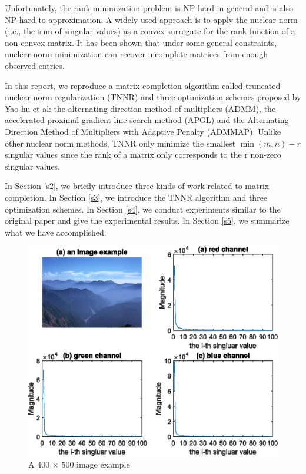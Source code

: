 \documentclass{article}
\begin{document}
{Unfortunately, the rank minimization problem is NP-hard in general and is also NP-hard to approximation.  A widely used approach is to apply the nuclear norm (i.e., the sum of singular values) as a convex surrogate for the rank function of a non-convex matrix. It has been shown that under some general constraints, nuclear norm minimization can recover incomplete matrices from enough observed entries.

In this report, we reproduce a matrix completion algorithm called truncated nuclear norm regularization (TNNR) and three optimization schemes proposed by Yao hu et al: the alternating direction method of multipliers (ADMM), the accelerated proximal gradient line search method (APGL) and the Alternating Direction Method of Multipliers with Adaptive Penalty (ADMMAP). 
Unlike other nuclear norm methods, TNNR only minimize the smallest $\min(m, n) - r$  singular values since the rank of a matrix only corresponds to the r non-zero singular values. 

In Section \ref{s2}, we briefly introduce three kinds of work related to matrix completion. In Section \ref{s3}, we introduce the TNNR algorithm and three optimization schemes. In Section \ref{s4}, we conduct experiments similar to the original paper and give the experimental results. In Section \ref{s5}, we summarize what we have accomplished.

\begin{figure}[ht]
	\centering
	\includegraphics[]{assets/fig1.eps}
	\caption{A 400 $\times$ 500 image example}
	\label{fig1}
\end{figure}

}
\end{document}
